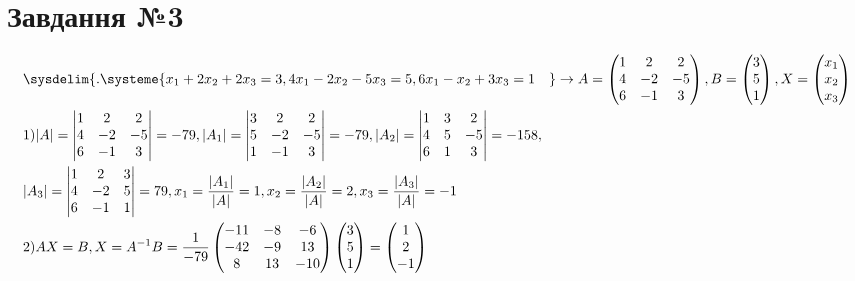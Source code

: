 \documentclass{report}
\begin{document}
\section{Завдання №3}
\begin{equation}\label{eq3}\begin{split}
	& \sysdelim\{.\systeme{x_1 + 2x_2 + 2x_3=3, 4x_1 - 2x_2 - 5x_3 = 5, 6x_1 - x_2 + 3x_3 = 1\quad} \to A = \begin{pmatrix}1 & 2 & 2 \\ 4 & -2 & -5 \\ 6 & -1 & 3\end{pmatrix}, B = \begin{pmatrix} 3 \\ 5 \\ 1\end{pmatrix}, X = \begin{pmatrix}x_1 \\ x_2 \\ x_3 \end{pmatrix} \\
	& 1)  \lvert A\rvert = \begin{vmatrix}1 & 2 & 2 \\ 4 & -2 & -5 \\ 6 & -1 & 3\end{vmatrix} = -79,  \lvert A_1\rvert =  \begin{vmatrix}3 & 2 & 2 \\ 5 & -2 & -5 \\ 1 & -1 & 3\end{vmatrix} = -79, \lvert A_2\rvert =  \begin{vmatrix}1 & 3 & 2 \\ 4 & 5 & -5 \\ 6 & 1 & 3\end{vmatrix} = -158, \\
& \lvert A_3\rvert =  \begin{vmatrix}1 & 2 & 3 \\ 4 & -2 & 5\\ 6 & -1 & 1\end{vmatrix} = 79, x_1 = \frac{\lvert A_1\rvert}{\lvert A\rvert} =1 , x_2 = 			\frac{\lvert A_2\rvert}{\lvert A\rvert} = 2, x_3 = \frac{\lvert A_3\rvert}{\lvert A\rvert} = -1\\
	& 2) AX = B, X = A^{-1}B = \frac{1}{-79}\begin{pmatrix}-11 & -8 & -6\\ -42 & -9 & 13\\ 8 & 13 & -10\end{pmatrix}\begin{pmatrix} 3 \\ 5 \\ 1\end{pmatrix} = \begin{pmatrix} 1 \\ 2 \\ -1\end{pmatrix} \\

\end{split}
\end{equation}
\end{document}
